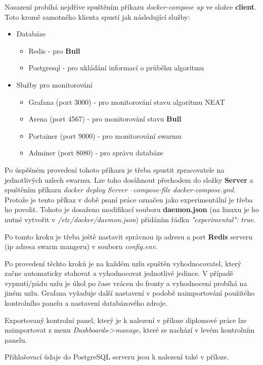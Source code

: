 Nasazení probíhá nejdříve spuštěním příkazu \emph{docker-compose up} ve složce \textbf{client}. Toto kromě samotného klienta spustí jak následující služby:
\begin{itemize}
	\item Databáze
	\begin{itemize}
		\item Redis - pro \textbf{Bull}
		\item Postgresql - pro ukládání informací o průběhu algoritmu
	\end{itemize}
	\item Služby pro monitorování
	\begin{itemize}
		\item Grafana (port 3000) - pro monitorování stavu algoritmu NEAT
		\item Arena (port 4567) - pro monitorování stavu \textbf{Bull}
		\item Portainer (port 9000) - pro monitorování swarmu
		\item Adminer (port 8080) - pro správu databáze
	\end{itemize}
\end{itemize}
Po úspěšném provedení tohoto příkazu je třeba spustit zpracovatele na jednotlivých uzlech swarmu. Lze toho dosáhnout přechodem do složky \textbf{Server} a spuštěním příkazu \emph{docker deploy Server --compose-file docker-compose.yml}. Protože je tento příkaz v době psaní práce označen jako experimentální je třeba ho povolit. Tohoto je dosaženo modifikací souboru \textbf{daemon.json} (na linuxu je ho nutné vytvořit v \emph{/etc/docker/daemon.json}) přidáním řádku \emph{"experimental": true}.

Po tomto kroku je třeba ještě nastavit správnou ip adresu a port \textbf{Redis} serveru (ip adresa swarm mangeru) v souboru \emph{config.env}.

Po provedení těchto kroků je na každém uzlu spuštěn vyhodnocovatel, který začne automaticky stahovat a vyhodnocovat jednotlivé jedince. V případě vypnutí/pádu uzlu je úkol po čase vrácen do fronty a vyhodnocení probíhá na jiném uzlu.
Grafana vyžaduje další nastavení v podobě naimportování použitého kontrolního panelu a nastavení databázového zdroje.

Exportovaný kontrolní panel, který je k nalezení v příloze diplomové práce lze naimportovat z menu \emph{Dashboards}->\emph{manage}, které se nachází v levém kontrolním panelu. 

Přihlašovací údaje do PostgreSQL serveru jsou k nalezení také v příloze. 

